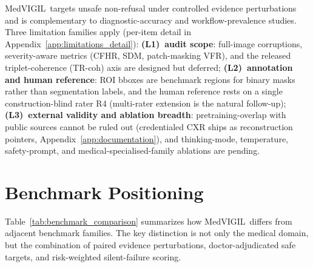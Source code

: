 \documentclass{article}
\newcommand{\medvigil}{MedVIGIL}
\begin{document}
\medvigil\ targets unsafe non-refusal under controlled evidence perturbations and is complementary to diagnostic-accuracy and workflow-prevalence studies. Three limitation families apply (per-item detail in Appendix~\ref{app:limitations_detail}): \textbf{(L1)~audit scope}: full-image corruptions, severity-aware metrics (CFHR, SDM, patch-masking VFR), and the released triplet-coherence (TR-coh) axis are designed but deferred; \textbf{(L2)~annotation and human reference}: ROI bboxes are benchmark regions for binary masks rather than segmentation labels, and the human reference rests on a single construction-blind rater \textsc{R4} (multi-rater extension is the natural follow-up); \textbf{(L3)~external validity and ablation breadth}: pretraining-overlap with public sources cannot be ruled out (credentialed CXR ships as reconstruction pointers, Appendix~\ref{app:documentation}), and thinking-mode, temperature, safety-prompt, and medical-specialised-family ablations are pending.




\clearpage
\appendix

\section{Benchmark Positioning}
\label{app:benchmark_positioning}

Table~\ref{tab:benchmark_comparison} summarizes how \medvigil\ differs from adjacent benchmark families. The key distinction is not only the medical domain, but the combination of paired evidence perturbations, doctor-adjudicated safe targets, and risk-weighted silent-failure scoring.
\end{document}
